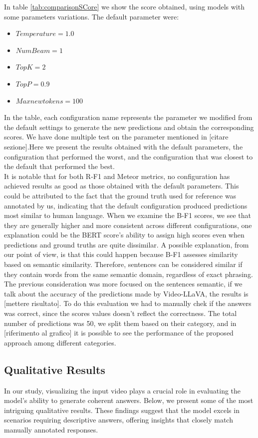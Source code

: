 \documentclass[conference]{IEEEtran}
\begin{document}
In table \ref{tab:comparisonSCore} we show the score obtained, using models with some parameters variations.
The default parameter were:
\begin{itemize}[before=\footnotesize]
    \item $Temperature = 1.0$
    \item $Num Beam = 1$
    \item $Top K = 2$
    \item $Top P = 0.9$
    \item $Max new tokens = 100$
\end{itemize}
In the table, each configuration name represents the parameter we modified from the default settings to generate the new predictions and obtain the corresponding scores.
We have done multiple test on the parameter mentioned in [citare sezione].Here we present the results obtained with the default parameters, the configuration that performed the worst, and the configuration that was closest to the default that performed the best.\\
It is notable that for both R-F1 and Meteor metrics, no configuration has achieved results as good as those obtained with the default parameters. This could be attributed to the fact that the ground truth used for reference was annotated by us, indicating that the default configuration produced predictions most similar to human language. When we examine the B-F1 scores, we see that they are generally higher and more consistent across different configurations, one explanation could be the BERT score's ability to assign high scores even when predictions and ground truths are quite dissimilar. A possible explanation, from our point of view, is that this could happen because B-F1 assesses similarity based on semantic similarity. Therefore, sentences can be considered similar if they contain words from the same semantic domain, regardless of exact phrasing.
\\
The previous consideration was more focused on the sentences semantic, if we talk about the accuracy of the predictions made by Video-LLaVA, the results is [mettere risultato]. To do this evaluation we had to manually chek if the answers was correct, since the scores values doesn't reflect the correctness. The total number of predictions was 50, we split them based on their category, and in [riferimento al grafico] it is possible to see the performance of the proposed approach among different categories.

\subsection{Qualitative Results}
In our study, visualizing the input video plays a crucial role in evaluating the model's ability to generate coherent answers. Below, we present some of the most intriguing qualitative results. These findings suggest that the model excels in scenarios requiring descriptive answers, offering insights that closely match manually annotated responses.
\end{document}
